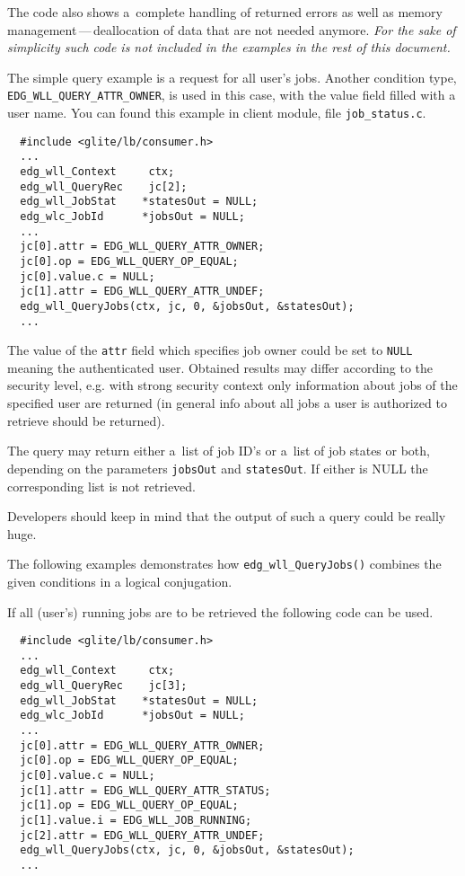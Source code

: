 The code also shows a~complete handling of returned errors as well as memory
management\,---\,deallocation of data that are not needed anymore.
\emph{For the sake of simplicity such code is not included in the
examples in the rest of this document.}

\label{JQ-auj}


The simple query example is a request for all user's jobs. Another
condition type, \\
\texttt{EDG\_WLL\_QUERY\_ATTR\_OWNER}, is used in this case, with the 
value field filled with a user name. You can found this example in client module, file \texttt{job\_status.c}.

\begin{verbatim}
  #include <glite/lb/consumer.h>
  ...
  edg_wll_Context     ctx;    
  edg_wll_QueryRec    jc[2];
  edg_wll_JobStat    *statesOut = NULL;
  edg_wlc_JobId      *jobsOut = NULL;
  ...
  jc[0].attr = EDG_WLL_QUERY_ATTR_OWNER;
  jc[0].op = EDG_WLL_QUERY_OP_EQUAL;
  jc[0].value.c = NULL;
  jc[1].attr = EDG_WLL_QUERY_ATTR_UNDEF;
  edg_wll_QueryJobs(ctx, jc, 0, &jobsOut, &statesOut);
  ...
\end{verbatim}

The value of the \texttt{attr} field which specifies job owner
could be set to \texttt{NULL} meaning the authenticated user.
Obtained results may differ according to the security level, e.g. with strong security
context only information about jobs of the specified user are returned
(in general info about all jobs a user is authorized to retrieve should be
returned).

The query may return either a~list of job ID's or a~list of job states or both,
depending on the parameters \texttt{jobsOut} and \texttt{statesOut}.
If either is NULL the corresponding list is not retrieved.

Developers should keep in mind that the output of such a query could be really huge.
\par

The following examples demonstrates how \texttt{edg\_wll\_QueryJobs()} combines 
the given conditions in a logical conjugation.

\label{JQ-rj}

If all (user's) running jobs are to be retrieved the following code can
be used.
\begin{verbatim}
  #include <glite/lb/consumer.h>
  ...
  edg_wll_Context     ctx;    
  edg_wll_QueryRec    jc[3];
  edg_wll_JobStat    *statesOut = NULL;
  edg_wlc_JobId      *jobsOut = NULL;
  ...
  jc[0].attr = EDG_WLL_QUERY_ATTR_OWNER;
  jc[0].op = EDG_WLL_QUERY_OP_EQUAL;
  jc[0].value.c = NULL;
  jc[1].attr = EDG_WLL_QUERY_ATTR_STATUS;
  jc[1].op = EDG_WLL_QUERY_OP_EQUAL;
  jc[1].value.i = EDG_WLL_JOB_RUNNING;
  jc[2].attr = EDG_WLL_QUERY_ATTR_UNDEF;
  edg_wll_QueryJobs(ctx, jc, 0, &jobsOut, &statesOut);
  ...
\end{verbatim}

